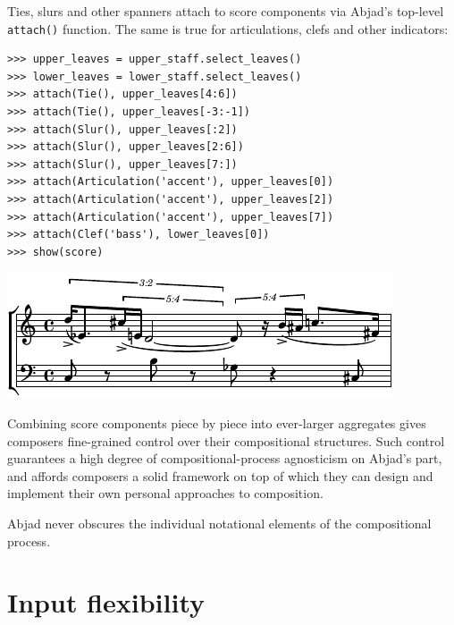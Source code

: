 \documentclass{article}
\begin{document}
\noindent Ties, slurs and other spanners attach to score components via Abjad's
top-level \texttt{attach()} function. The same is true for articulations, clefs
and other indicators:

\begin{lstlisting}
>>> upper_leaves = upper_staff.select_leaves()
>>> lower_leaves = lower_staff.select_leaves()
>>> attach(Tie(), upper_leaves[4:6])
>>> attach(Tie(), upper_leaves[-3:-1])
>>> attach(Slur(), upper_leaves[:2])
>>> attach(Slur(), upper_leaves[2:6])
>>> attach(Slur(), upper_leaves[7:])
>>> attach(Articulation('accent'), upper_leaves[0])
>>> attach(Articulation('accent'), upper_leaves[2])
>>> attach(Articulation('accent'), upper_leaves[7])
>>> attach(Clef('bass'), lower_leaves[0])
>>> show(score)
\end{lstlisting}
\includegraphics{assets/lilypond-e8875dc7bab70898d816689c758fd7be.pdf}

\noindent Combining score components piece by piece into ever-larger aggregates gives
composers fine-grained control over their compositional structures. Such
control guarantees a high degree of compositional-process agnosticism on
Abjad's part, and affords composers a solid framework on top of which they can
design and implement their own personal approaches to composition.

Abjad never obscures the individual notational elements of the compositional process.

\section{Input flexibility}
\end{document}
